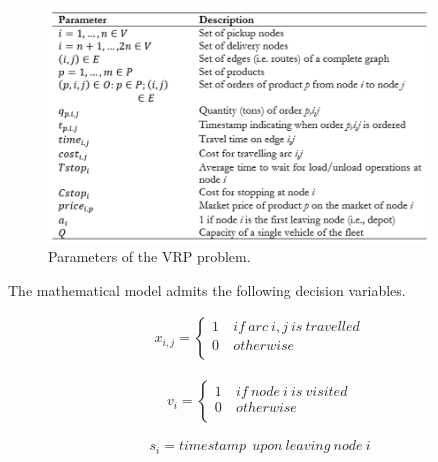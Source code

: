 \begin{figure}[hbt!]
\centering
\includegraphics[width=0.9\textwidth]{SectionDistribution/control_figures/tab_VRP_vessels.png}
\captionsetup{type=table}
\caption{Parameters of the VRP problem.}
\label{tab_VRP_vessels}
\end{figure}



\clearpage
The mathematical model admits the following decision variables.

\begin{equation}
   \begin{split}
   x_{i,j}=\left\{
                \begin{array}{ll}
                  1\ & if\ arc\ i,j\ is\ travelled\\
                  0 & otherwise\\
                \end{array}
              \right.
   \end{split}
\end{equation}

\begin{equation}
   \begin{split}
   v_i=\left\{
                \begin{array}{ll}
                  1\ & if\ node\ i\ is\ visited\\
                  0 & otherwise\\
                \end{array}
              \right.
   \end{split}
\end{equation}

\begin{equation}
   s_i=timestamp\ \ upon\ leaving\ node\ i
\end{equation}

